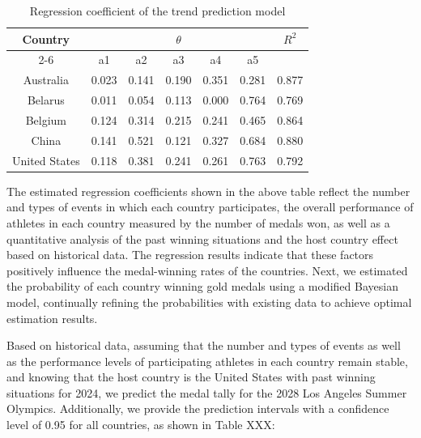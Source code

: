 \documentclass{mcmthesis}
\begin{document}
\begin{table}
\centering
\caption{Regression coefficient of the trend prediction model}
\begin{tabular}{|c|c|c|c|c|c|c|} 
\hline
\multirow{2}{*}{Country} & \multicolumn{5}{c|}{$\theta$}               & \multirow{2}{*}{$R^{2}$}  \\ 
\cline{2-6}
                         & a1    & a2    & a3    & a4    & a5    &                    \\ 
\hline
Australia                & 0.023 & 0.141 & 0.190 & 0.351 & 0.281 & 0.877              \\ 
\hline
Belarus                  & 0.011 & 0.054 & 0.113 & 0.000 & 0.764 & 0.769              \\ 
\hline
Belgium                  & 0.124 & 0.314 & 0.215 & 0.241 & 0.465 & 0.864              \\ 
\hline
China                    & 0.141 & 0.521 & 0.121 & 0.327 & 0.684 & 0.880              \\ 
\hline
United States            & 0.118 & 0.381 & 0.241 & 0.261 & 0.763 & 0.792              \\
\hline
\end{tabular}
\end{table}

The estimated regression coefficients shown in the above table reflect the number and types of events in which each country participates, the overall performance of athletes in each country measured by the number of medals won, as well as a quantitative analysis of the past winning situations and the host country effect based on historical data. The regression results indicate that these factors positively influence the medal-winning rates of the countries.
Next, we estimated the probability of each country winning gold medals using a modified Bayesian model, continually refining the probabilities with existing data to achieve optimal estimation results.

Based on historical data, assuming that the number and types of events as well as the performance levels of participating athletes in each country remain stable, and knowing that the host country is the United States with past winning situations for 2024, we predict the medal tally for the 2028 Los Angeles Summer Olympics. Additionally, we provide the prediction intervals with a confidence level of 0.95 for all countries, as shown in Table XXX:
\end{document}
